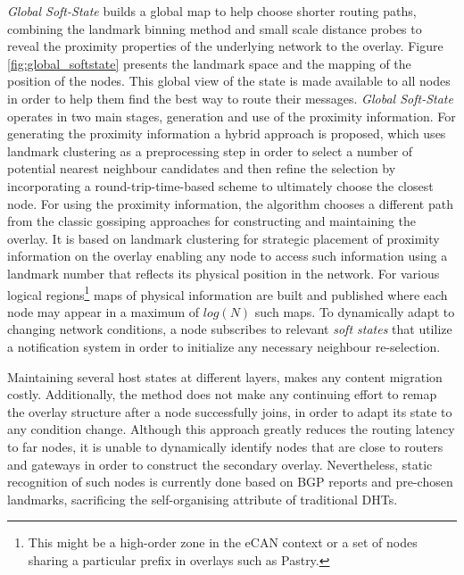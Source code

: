 \textit{Global Soft-State} \cite{xu_globstate_2003} builds a global map to help
choose shorter routing paths, combining the landmark binning method and small
scale distance probes to reveal the proximity properties of the underlying
network to the overlay. Figure \ref{fig:global_softstate} presents the landmark
space and the mapping of the position of the nodes. This global view of the
state is made available to all nodes in order to help them find the best way to
route their messages. \textit{Global Soft-State} operates in two main stages,
generation and use of the proximity information. For generating the proximity
information a hybrid approach is proposed, which uses landmark clustering as a
preprocessing step in order to select a number of potential nearest neighbour
candidates and then refine the selection by incorporating a
round-trip-time-based scheme to ultimately choose the closest node. For using
the proximity information, the algorithm chooses a different path from the
classic gossiping approaches for constructing and maintaining the overlay. It is
based on landmark clustering for strategic placement of proximity information on
the overlay enabling any node to access such information using a landmark number
that reflects its physical position in the network. For various logical
regions\footnote{This might be a high-order zone in the eCAN\cite{xu_ecan_2002}
context or a set of nodes sharing a particular prefix in overlays such as
Pastry.} maps of physical information are built and published where each node
may appear in a maximum of $log\left( N \right)$ such maps. To dynamically adapt
to changing network conditions, a node subscribes to relevant \emph{soft states}
that utilize a notification system in order to initialize any necessary
neighbour re-selection.

Maintaining several host states at different layers, makes any content migration
costly. Additionally, the method does not make any continuing effort to remap
the overlay structure after a node successfully joins, in order to adapt its
  state to any condition change. Although this approach greatly reduces the
  routing latency to far nodes, it is unable to dynamically identify nodes that
  are close to routers and gateways in order to construct the secondary overlay.
Nevertheless, static recognition of such nodes is currently done based on BGP
reports and pre-chosen landmarks, sacrificing the self-organising attribute of
traditional DHTs.

